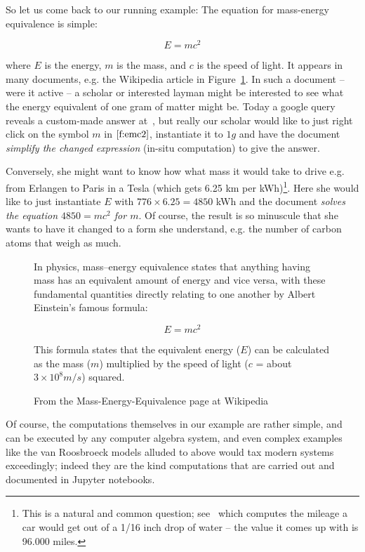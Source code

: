 So let us come back to our running example: The equation for mass-energy equivalence is
simple:

\begin{equation}\label{f:emc2}
  E=mc^2
\end{equation}

where $E$ is the energy, $m$ is the mass, and $c$ is the speed of light. It appears in
many documents, e.g. the Wikipedia article in Figure~\ref{fig:emc2-wikipedia}. In such a
document -- were it active -- a scholar or interested layman might be interested to see
what the energy equivalent of one gram of matter might be. Today a google query reveals a
custom-made answer at~\cite{Odenwald:q388}, but really our scholar would like to just right
click on the symbol $m$ in $\ref{f:emc2}$, instantiate it to $1g$ and have the document
\emph{simplify the changed expression} (in-situ computation) to give the answer.

Conversely, she might want to know how what mass it would take to drive e.g. from Erlangen
to Paris in a Tesla (which gets 6.25 km per kWh)\footnote{This is a natural and common
  question; see~\cite{RT:emc2} which computes the mileage a car would get out of a 1/16
  inch drop of water -- the value it comes up with is 96.000 miles.}. Here she would like
to just instantiate $E$ with $776 \times 6.25=4850$ kWh and the document \emph{solves the
  equation $4850=mc^2$ for $m$}. Of course, the result is so minuscule that she wants to have it changed to a
form she understand, e.g. the number of carbon atoms that weigh as much.

\begin{figure}\centering
  \begin{boxedquote}
    In physics, mass–energy equivalence states that anything having mass has an equivalent
    amount of energy and vice versa, with these fundamental quantities directly relating
    to one another by Albert Einstein's famous formula:

    \[E=mc^2\] 

    This formula states that the equivalent energy ($E$) can be calculated as the mass ($m$)
    multiplied by the speed of light ($c$ = about $3\times10^8 m/s$) squared.
  \end{boxedquote}
  \caption{From the Mass-Energy-Equivalence page at Wikipedia~\cite{WP:emc2}}
  \label{fig:emc2-wikipedia}
\end{figure}

Of course, the computations themselves in our example are rather simple, and can be
executed by any computer algebra system, and even complex examples like the van Roosbroeck
models alluded to above would tax modern systems exceedingly; indeed they are the kind
computations that are carried out and documented in Jupyter notebooks. 

